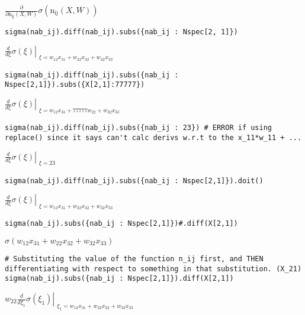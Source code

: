 \documentclass[
]{article}
\begin{document}
\(\displaystyle \frac{\partial}{\partial \operatorname{n_{ij}}{\left(X,W \right)}} \sigma{\left(\operatorname{n_{ij}}{\left(X,W \right)} \right)}\)

\begin{verbatim}
sigma(nab_ij).diff(nab_ij).subs({nab_ij : Nspec[2, 1]})
\end{verbatim}

\(\displaystyle \left. \frac{d}{d \xi} \sigma{\left(\xi \right)} \right|_{\substack{ \xi=w_{12} x_{31} + w_{22} x_{32} + w_{32} x_{33} }}\)

\begin{verbatim}
sigma(nab_ij).diff(nab_ij).subs({nab_ij : Nspec[2,1]}).subs({X[2,1]:77777})
\end{verbatim}

\(\displaystyle \left. \frac{d}{d \xi} \sigma{\left(\xi \right)} \right|_{\substack{ \xi=w_{12} x_{31} + 77777 w_{22} + w_{32} x_{33} }}\)

\begin{verbatim}
sigma(nab_ij).diff(nab_ij).subs({nab_ij : 23}) # ERROR if using replace() since it says can't calc derivs w.r.t to the x_11*w_11 + ...
\end{verbatim}

\(\displaystyle \left. \frac{d}{d \xi} \sigma{\left(\xi \right)} \right|_{\substack{ \xi=23 }}\)

\begin{verbatim}
sigma(nab_ij).diff(nab_ij).subs({nab_ij : Nspec[2,1]}).doit()
\end{verbatim}

\(\displaystyle \left. \frac{d}{d \xi} \sigma{\left(\xi \right)} \right|_{\substack{ \xi=w_{12} x_{31} + w_{22} x_{32} + w_{32} x_{33} }}\)

\begin{verbatim}
sigma(nab_ij).subs({nab_ij : Nspec[2,1]})#.diff(X[2,1])
\end{verbatim}

\(\displaystyle \sigma{\left(w_{12} x_{31} + w_{22} x_{32} + w_{32} x_{33} \right)}\)

\begin{verbatim}
# Substituting the value of the function n_ij first, and THEN differentiating with respect to something in that substitution. (X_21)
sigma(nab_ij).subs({nab_ij : Nspec[2,1]}).diff(X[2,1])
\end{verbatim}

\(\displaystyle w_{22} \left. \frac{d}{d \xi_{1}} \sigma{\left(\xi_{1} \right)} \right|_{\substack{ \xi_{1}=w_{12} x_{31} + w_{22} x_{32} + w_{32} x_{33} }}\)
\end{document}
